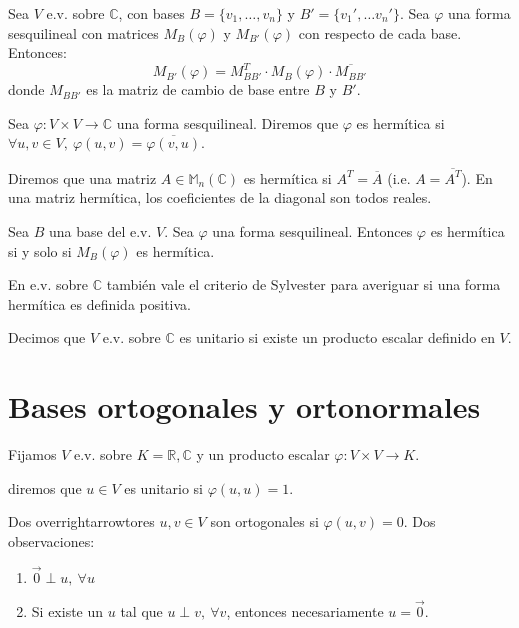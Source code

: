 \documentclass[14pt]{book}
\begin{document}
\begin{tm}
	Sea $V$ e.v. sobre $\mathbb{C}$, con bases $B = \{v_1, \dots, v_n\}$ y $B' = \{v_1', \dots v_n'\}$. Sea $\varphi$ una forma sesquilineal con matrices $M_B(\varphi)$ y $M_{B'}(\varphi)$ con respecto de cada base. Entonces:
	\[
		M_{B'}(\varphi) = M_{BB'}^T \cdot M_B(\varphi) \cdot \overline{M_{BB'}}
	\]
	donde $M_{BB'}$ es la matriz de cambio de base entre $B$ y $B'$.
\end{tm}

\begin{dfn}
	Sea $\varphi : V \times V \to \mathbb{C}$ una forma sesquilineal. Diremos que $\varphi$ es hermítica si $\forall u,v \in V,\ \varphi(u, v) = \overline{\varphi(v, u)}$.
	
	Diremos que una matriz $A \in \mathbb{M}_n(\mathbb{C})$ es hermítica si $A^T = \overline{A}$ (i.e. $A = \overline{A^T}$). En una matriz hermítica, los coeficientes de la diagonal son todos reales.
\end{dfn}

\begin{tm}
	Sea $B$ una base del e.v. $V$. Sea $\varphi$ una forma sesquilineal. Entonces $\varphi$ es hermítica si y solo si $M_B(\varphi)$ es hermítica.
\end{tm}

En e.v. sobre $\mathbb{C}$ también vale el criterio de Sylvester para averiguar si una forma hermítica es definida positiva.

\begin{dfn}
	Decimos que $V$ e.v. sobre $\mathbb{C}$ es unitario si existe un producto escalar definido en $V$.
\end{dfn}

\section{Bases ortogonales y ortonormales}

Fijamos $V$ e.v. sobre $K = \mathbb{R, C}$ y un producto escalar $\varphi : V \times V \to K$.

\begin{dfn}
	diremos que $u \in V$ es unitario si $\varphi(u, u) = 1$.
\end{dfn}

\begin{dfn}
	Dos overrightarrowtores $u, v \in V$ son ortogonales si $\varphi(u, v) = 0$. Dos observaciones:
	\begin{enumerate}
		\item $\overrightarrow{0} \perp u,\ \forall u$
		\item Si existe un $u$ tal que $u \perp v,\ \forall v$, entonces necesariamente $u = \overrightarrow{0}$.
	\end{enumerate}
\end{dfn}
\end{document}
